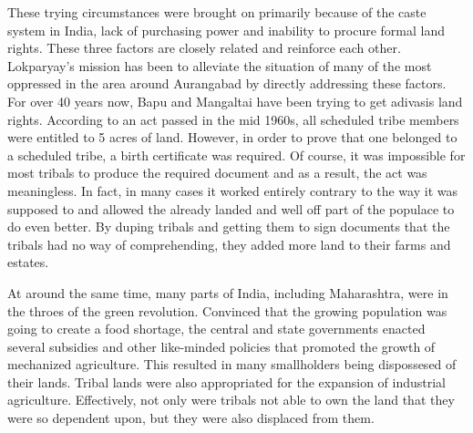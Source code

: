 \documentclass[report.tex]{subfiles}
\begin{document}
These trying circumstances were brought on primarily because of the caste system in India, lack of purchasing power and inability to procure formal land rights. These three factors are closely related and reinforce each other. Lokparyay's mission has been to alleviate the situation of many of the most oppressed in the area around Aurangabad by directly addressing these factors. For over 40 years now, Bapu and Mangaltai have been trying to get adivasis land rights. According to an act passed in the mid 1960s, all scheduled tribe members were entitled to 5 acres of land. However, in order to prove that one belonged to a scheduled tribe, a birth certificate was required. Of course, it was impossible for most tribals to produce the required document and as a result, the act was meaningless. In fact, in many cases it worked entirely contrary to the way it was supposed to and allowed the already landed and well off part of the populace to do even better. By duping tribals and getting them to sign documents that the tribals had no way of comprehending, they added more land to their farms and estates.

At around the same time, many parts of India, including Maharashtra, were in the throes of the green revolution. Convinced that the growing population was going to create a food shortage, the central and state governments enacted several subsidies and other like-minded policies that promoted the growth of mechanized agriculture. This resulted in many smallholders being dispossesed of their lands. Tribal lands were also appropriated for the expansion of industrial agriculture. Effectively, not only were tribals not able to own the land that they were so dependent upon, but they were also displaced from them.
\end{document}
